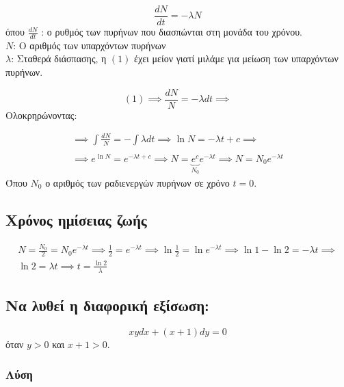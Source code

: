 \documentclass[12pt,a4paper]{article}
\begin{document}
\[
\frac{dN}{dt}=-\lambda N \tag{1}
\]
όπου $\displaystyle \frac{dN}{dt}$ : ο ρυθμός των πυρήνων που διασπώνται στη μονάδα του χρόνου. \vspace{6mm} \\ 
$N$: Ο αριθμός των υπαρχόντων πυρήνων \vspace{1mm} \\ 
$\lambda$: Σταθερά διάσπασης, η $(1)$ έχει μείον γιατί μιλάμε για μείωση των υπαρχόντων πυρήνων.

\[
(1)\implies \frac{dN}{N}=- \lambda dt \implies  \]
Ολοκρηρώνοντας:

\begin{gather*}
\implies \int \frac{dN}{N}=-\int \lambda dt \implies \ln N =-\lambda t + c \implies \\ \\ \implies e^{\ln N}=e^{-\lambda t + c }\implies N=\underbrace{e^c}_{N_0}e^{-\lambda t} \implies \boxed{N=N_0e^{-\lambda t}}
\end{gather*}
Όπου $N_0$ ο αριθμός των ραδιενεργών πυρήνων σε χρόνο $t=0$.

\subsection{Χρόνος ημίσειας ζωής}

\begin{gather*}
N=\frac{N_0}{2}=N_0e^{-\lambda t} \implies \frac{1}{2}=e^{-\lambda t} \implies \ln \frac{1}{2}=\ln e^{-\lambda t} \implies \ln 1 - \ln 2 =-\lambda t \implies \\ \ln 2 =\lambda t \implies \boxed{t=\frac{\ln 2}{\lambda}}
\end{gather*}



\vspace{3cm}

\subsection{Να λυθεί η διαφορική εξίσωση:}
\[
xydx +(x+1)dy=0 
\]
όταν $y>0$ και $x+1>0$.

\subsubsection*{Λύση}
\end{document}
